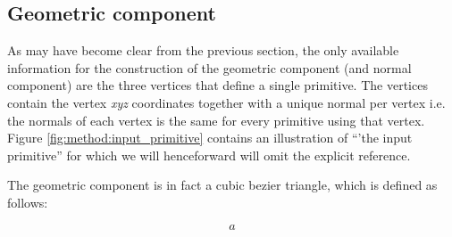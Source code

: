 
\subsection{Geometric component}
\label{ss:geometric_component}

As may have become clear from the previous section, the only available information for the construction of the geometric component (and normal component) are the three vertices that define a single primitive. The vertices contain the vertex \textit{xyz} coordinates together with a unique normal per vertex i.e. the normals of each vertex is the same for every primitive using that vertex. Figure \ref{fig:method:input_primitive} contains an illustration of ``'the input primitive'' for which we will henceforward will omit the explicit reference. 

The geometric component is in fact a cubic bezier triangle, which is defined as follows: 

\begin{equation}\label{eq:method:cubic_bezier_patch}
	a
\end{equation}

